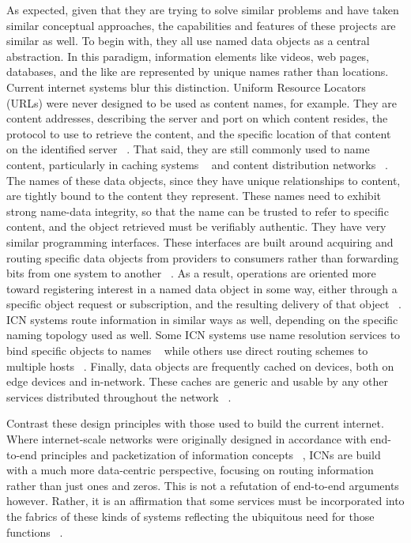 As expected, given that they are trying to solve similar problems and have taken similar conceptual approaches, the capabilities and features of these projects are similar as well.  To begin with, they all use named data objects as a central abstraction.  In this paradigm, information elements like videos, web pages, databases, and the like are represented by unique names rather than locations.  Current internet systems blur this distinction.  Uniform Resource Locators (URLs) were never designed to be used as content names, for example.  They are content addresses, describing the server and port on which content resides, the protocol to use to retrieve the content, and the specific location of that content on the identified server ~\cite{rfc3986}.  That said, they are still commonly used to name content, particularly in caching systems ~\cite{rfc2616} and content distribution networks ~\cite{Nygren:2010:ANP:1842733.1842736}.  The names of these data objects, since they have unique relationships to content, are tightly bound to the content they represent.  These names need to exhibit strong name-data integrity, so that the name can be trusted to refer to specific content, and the object retrieved must be verifiably authentic.  They have very similar programming interfaces.  These interfaces are built around acquiring and routing specific data objects from providers to consumers rather than forwarding bits from one system to another ~\cite{rfc791,rfc793}.  As a result, operations are oriented more toward registering interest in a named data object in some way, either through a specific object request or subscription, and the resulting delivery of that object ~\cite{6231276}.  ICN systems route information in similar ways as well, depending on the specific naming topology used as well.  Some ICN systems use name resolution services to bind specific objects to names ~\cite{4698847} while others use direct routing schemes to multiple hosts ~\cite{Ghodsi:2011:NCA:2018584.2018586}.  Finally, data objects are frequently cached on devices, both on edge devices and in-network.  These caches are generic and usable by any other services distributed throughout the network ~\cite{6231276}.

Contrast these design principles with those used to build the current internet.  Where internet-scale networks were originally designed in accordance with end-to-end principles and packetization of information concepts ~\cite{Cl:88,SaReCl:84}, ICNs are build with a much more data-centric perspective, focusing on routing information rather than just ones and zeros.  This is not a refutation of end-to-end arguments however.  Rather, it is an affirmation that some services must be incorporated into the fabrics of these kinds of systems reflecting the ubiquitous need for those functions ~\cite{BlCl:01}.

